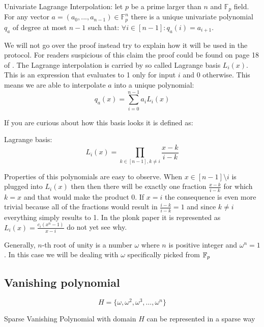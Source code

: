 \begin{lemma}
    Univariate Lagrange Interpolation: let $p$ be a prime larger than $n$ and $\mathbb{F}_p$ field. For any vector $a = (a_0, ..., a_{n-1}) \in \mathbb{F}_p^n$ there is a unique univariate polynomial $q_a$ of degree at most $n-1$ such that: $\forall i \in [n-1]: q_a(i) = a_{i+1}$.
\end{lemma}

We will not go over the proof instead try to explain how it will be used in the protocol. For readers suspicious of this claim the proof could be found on page 18 of \cite{ProofArgsAndZk}. The Lagrange interpolation is carried by so called Lagrange basis $L_i(x)$. This is an expression that evaluates to 1 only for input $i$ and 0 otherwise. This means we are able to interpolate $a$ into a unique polynomial:
$$q_a(x) = \sum_{i=0}^{n-1} a_i L_i(x)$$

If you are curious about how this basis looks it is defined as:

\begin{definition}
    Lagrange basis: $$L_i(x) = \prod_{k \in [n-1], k \neq i} \frac{x-k}{i-k}$$
\end{definition}

Properties of this polynomials are easy to observe. When $x \in [n-1] \setminus i$ is plugged into $L_i(x)$ then then there will be exactly one fraction $\frac{x-k}{i-k}$ for which $k = x$ and that would make the product 0. If $x = i$ the consequence is even more trivial because all of the fractions would result in $\frac{i-k}{i-k} = 1$ and since $k \neq i$ everything simply results to 1. In the plonk paper it is represented as $L_i(x) = \frac{c_i(x^n-1)}{x-i}$ do not yet see why.

\begin{definition}
    Generally, $n$-th root of unity is a number $\omega$ where $n$ is positive integer and $\omega^n = 1$. In this case we will be dealing with $\omega$ specifically picked from $\mathbb{F}_p$
\end{definition}


\subsection{Vanishing polynomial}
$$H = \{\omega, \omega^2, \omega^3, \ldots, \omega^{n}\}$$

\begin{lemma}{Sparse Vanishing Polynomial}
    \label{lemma:vanishing-poly}
    with domain $H$ can be represented in a sparse way
\end{lemma}

